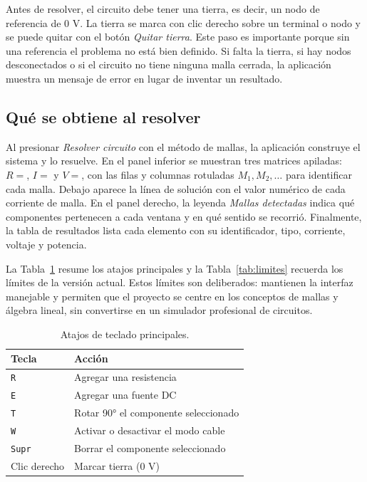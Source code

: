 \documentclass[journal]{IEEEtran}
\begin{document}
Antes de resolver, el circuito debe tener una tierra, es decir, un nodo de referencia de 0 V. La tierra se marca con clic derecho sobre un terminal o nodo y se puede quitar con el botón \emph{Quitar tierra}. Este paso es importante porque sin una referencia el problema no está bien definido. Si falta la tierra, si hay nodos desconectados o si el circuito no tiene ninguna malla cerrada, la aplicación muestra un mensaje de error en lugar de inventar un resultado.

\subsection{Qué se obtiene al resolver}

Al presionar \emph{Resolver circuito} con el método de mallas, la aplicación construye el sistema y lo resuelve. En el panel inferior se muestran tres matrices apiladas: $R=$, $I=$ y $V=$, con las filas y columnas rotuladas $M_1, M_2, \ldots$ para identificar cada malla. Debajo aparece la línea de solución con el valor numérico de cada corriente de malla. En el panel derecho, la leyenda \emph{Mallas detectadas} indica qué componentes pertenecen a cada ventana y en qué sentido se recorrió. Finalmente, la tabla de resultados lista cada elemento con su identificador, tipo, corriente, voltaje y potencia.

La Tabla~\ref{tab:atajos} resume los atajos principales y la Tabla~\ref{tab:limites} recuerda los límites de la versión actual. Estos límites son deliberados: mantienen la interfaz manejable y permiten que el proyecto se centre en los conceptos de mallas y álgebra lineal, sin convertirse en un simulador profesional de circuitos.

\begin{table}[t]
  \caption{Atajos de teclado principales.}
  \label{tab:atajos}
  \centering
  \small
  \begin{tabular}{@{}ll@{}}
    \hline
    Tecla & Acción \\
    \hline
    \texttt{R} & Agregar una resistencia \\
    \texttt{E} & Agregar una fuente DC \\
    \texttt{T} & Rotar 90° el componente seleccionado \\
    \texttt{W} & Activar o desactivar el modo cable \\
    \texttt{Supr} & Borrar el componente seleccionado \\
    Clic derecho & Marcar tierra (0 V) \\
    \hline
  \end{tabular}
\end{table}
\end{document}
